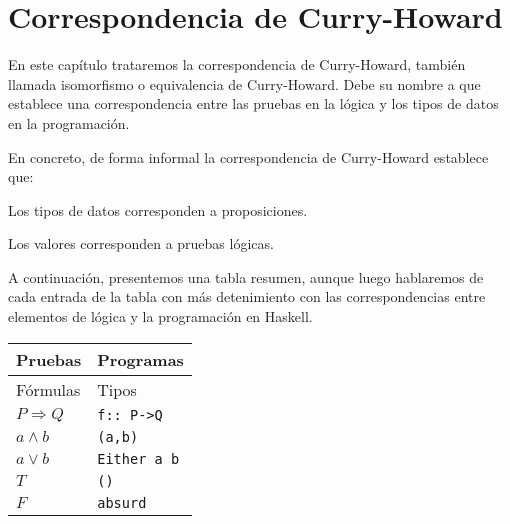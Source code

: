 \chapter{Correspondencia de Curry-Howard}

En este capítulo trataremos la correspondencia de Curry-Howard, también llamada isomorfismo o equivalencia de Curry-Howard. Debe su nombre a que establece una correspondencia entre las pruebas en la lógica y los tipos de datos en la programación. 

En concreto, de forma informal la correspondencia de Curry-Howard establece que:
\begin{itemize*}
\item Los tipos de datos corresponden a proposiciones.
\item Los valores corresponden a pruebas lógicas. 
\end{itemize*}

A continuación, presentemos una tabla resumen, aunque luego hablaremos de cada entrada de la tabla con más detenimiento con las correspondencias entre elementos de lógica y la programación en Haskell. 


 \begin{center}
   \begin{tabular}{| l | l |}
     \hline
      Pruebas            & Programas \\ \hline
      Fórmulas            & Tipos \\ \hline
      $P\Rightarrow Q$          & \texttt{f:: P->Q} \\ \hline
      $a\wedge b$     &  \texttt{(a,b)} \\ \hline
      $a\vee b$ & \texttt{Either a b}\\ \hline
      $T$    & \texttt{()} \\ \hline
     $F$ & \texttt{absurd} \\ \hline
   \end{tabular}
 \end{center}

